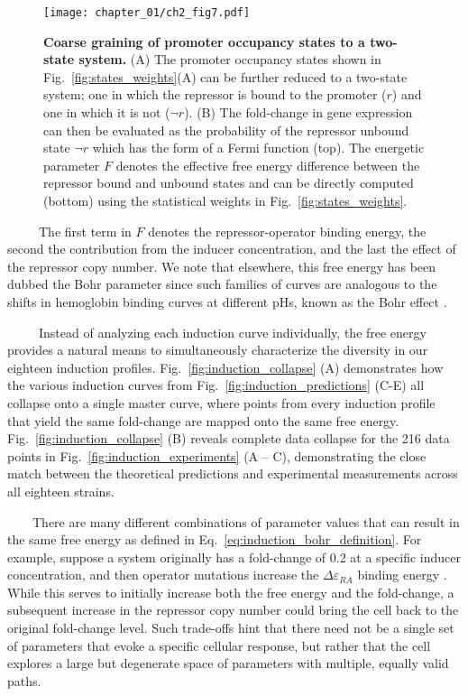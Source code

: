 \documentclass[12pt]{caltech_thesis}
\begin{document}
\hypertarget{fig:collapse_coarse_graining}{%
\begin{figure}
\centering
\texttt{[image: chapter\_01/ch2\_fig7.pdf]}
\caption[{Coarse graining of promoter occupancy states to a two-state
system.}]{\textbf{Coarse graining of promoter occupancy states to a
two-state system.} (A) The promoter occupancy states shown in
Fig.~\ref{fig:states_weights}(A) can be further reduced to a two-state
system; one in which the repressor is bound to the promoter (\(r\)) and
one in which it is not (\(\neg r\)). (B) The fold-change in gene
expression can then be evaluated as the probability of the repressor
unbound state \(\neg r\) which has the form of a Fermi function (top).
The energetic parameter \(F\) denotes the effective free energy
difference between the repressor bound and unbound states and can be
directly computed (bottom) using the statistical weights in
Fig.~\ref{fig:states_weights}.}
\label{fig:collapse_coarse_graining}
\end{figure}
}

~~~~~The first term in \(F\) denotes the repressor-operator binding
energy, the second the contribution from the inducer concentration, and
the last the effect of the repressor copy number. We note that
elsewhere, this free energy has been dubbed the Bohr parameter since
such families of curves are analogous to the shifts in hemoglobin
binding curves at different pHs, known as the Bohr effect
\autocite{mirny2010,phillips2015,einav2016}.

~~~~~Instead of analyzing each induction curve individually, the free
energy provides a natural means to simultaneously characterize the
diversity in our eighteen induction profiles.
Fig.~\ref{fig:induction_collapse} (A) demonstrates how the various
induction curves from Fig.~\ref{fig:induction_predictions} (C-E) all
collapse onto a single master curve, where points from every induction
profile that yield the same fold-change are mapped onto the same free
energy. Fig.~\ref{fig:induction_collapse} (B) reveals complete data
collapse for the 216 data points in Fig.~\ref{fig:induction_experiments}
(A -- C), demonstrating the close match between the theoretical
predictions and experimental measurements across all eighteen strains.

~~~~There are many different combinations of parameter values that can
result in the same free energy as defined in
Eq.~\ref{eq:induction_bohr_definition}. For example, suppose a system
originally has a fold-change of 0.2 at a specific inducer concentration,
and then operator mutations increase the \(\Delta\varepsilon_{RA}\)
binding energy \autocite{garcia2011}. While this serves to initially
increase both the free energy and the fold-change, a subsequent increase
in the repressor copy number could bring the cell back to the original
fold-change level. Such trade-offs hint that there need not be a single
set of parameters that evoke a specific cellular response, but rather
that the cell explores a large but degenerate space of parameters with
multiple, equally valid paths.
\end{document}
